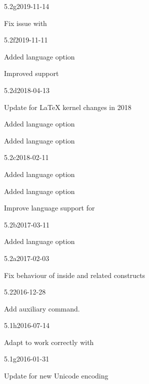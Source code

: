\documentclass{ltxdockit}[2010/09/26]
\begin{document}
\begin{changelog}
\begin{release}{5.2g}{2019-11-14}
\item Fix issue with 
\end{release}

\begin{release}{5.2f}{2019-11-11}
\item Added language option 
\item Improved  support
\end{release}

\begin{release}{5.2d}{2018-04-13}
\item Update for \LaTeX{} kernel changes in 2018
\item Added language option 
\item Added language option 
\end{release}

\begin{release}{5.2c}{2018-02-11}
\item Added language option 
\item Added language option 
\item Improve language support for 
\end{release}

\begin{release}{5.2b}{2017-03-11}
\item Added language option 
\end{release}

\begin{release}{5.2a}{2017-02-03}
	\item Fix behaviour of  inside  and
	  related constructs
\end{release}

\begin{release}{5.2}{2016-12-28}
	\item Add  auxiliary command.
\end{release}

\begin{release}{5.1h}{2016-07-14}
\item Adapt  to work correctly with \luatex
\end{release}

\begin{release}{5.1g}{2016-01-31}
\item Update for new  Unicode encoding
\end{release}


\end{changelog}
\end{document}
